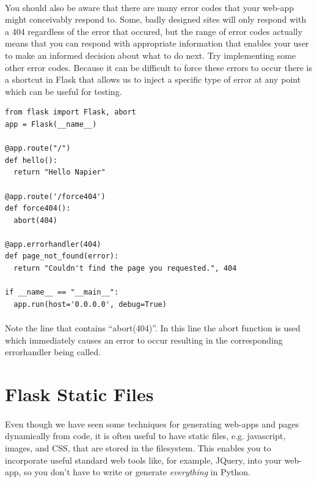 \documentclass[12pt, a4paper, oneside]{book}
\begin{document}
\paragraph{} You should also be aware that there are many error codes that your web-app might conceivably respond to. Some, badly designed sites will only respond with a 404 regardless of the error that occured, but the range of error codes actually means that you can respond with appropriate information that enables your user to make an informed decision about what to do next. Try implementing some other error codes. Because it can be difficult to force these errors to occur there is a shortcut in Flask that allows us to inject a specific type of error at any point which can be useful for testing.

\begin{lstlisting}
from flask import Flask, abort
app = Flask(__name__)

@app.route("/")
def hello():
  return "Hello Napier"

@app.route('/force404')
def force404():
  abort(404)

@app.errorhandler(404)
def page_not_found(error):
  return "Couldn't find the page you requested.", 404

if __name__ == "__main__":
  app.run(host='0.0.0.0', debug=True)
\end{lstlisting}

\paragraph{} Note the line that contains ``abort(404)''. In this line the abort function is used which immediately causes an error to occur resulting in the corresponding errorhandler being called.

\section{Flask Static Files}
\label{static}
\paragraph{} Even though we have seen some techniques for generating web-apps and pages dynamically from code, it is often useful to have static files, e.g. javascript, images, and CSS, that are stored in the filesystem. This enables you to incorporate useful standard web tools like, for example, JQuery, into your web-app, so you don't have to write or generate \emph{everything} in Python. 
\end{document}
